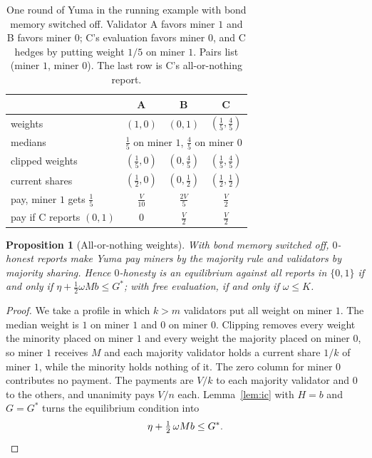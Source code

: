 \documentclass[sigconf,anonymous,review]{acmart}
\numberwithin{equation}{section}
\newtheorem{proposition}[theorem]{Proposition}
\newcommand{\Gs}{G^{*}}
\begin{document}
\begin{table}[t]
\caption{One round of Yuma in the running example with bond memory switched
off. Validator A favors miner $1$ and B favors miner $0$; C's evaluation favors
miner $0$, and C hedges by putting weight $1/5$ on miner $1$. Pairs list
(miner $1$, miner $0$). The last row is C's all-or-nothing report.}
\label{tab:round}
\small
\begin{tabular}{@{}lccc@{}}
\toprule
& A & B & C \\
\midrule
weights & $(1,0)$ & $(0,1)$ & $(\frac15,\frac45)$ \\
medians & \multicolumn{3}{c}{$\frac15$ on miner $1$, $\frac45$ on miner $0$} \\
clipped weights & $(\frac15,0)$ & $(0,\frac45)$ & $(\frac15,\frac45)$ \\
current shares & $(\frac12,0)$ & $(0,\frac12)$ & $(\frac12,\frac12)$ \\
pay, miner $1$ gets $\frac15$ & $\frac{V}{10}$ & $\frac{2V}{5}$ & $\frac V2$ \\
\addlinespace
pay if C reports $(0,1)$ & $0$ & $\frac V2$ & $\frac V2$ \\
\bottomrule
\end{tabular}
\end{table}

\begin{proposition}[All-or-nothing weights]\label{prop:binary}
With bond memory switched off, $0$-honest reports make Yuma pay miners by the
majority rule and validators by majority sharing. Hence $0$-honesty is an
equilibrium against all reports in $\{0,1\}$ if and only if
$\eta+\frac12\omega Mb\le\Gs$; with free evaluation, if and only if
$\omega\le K$.
\end{proposition}

\begin{proof}
We take a profile in which $k>m$ validators put all weight on miner $1$. The
median weight is $1$ on miner $1$ and $0$ on miner $0$. Clipping removes every
weight the minority placed on miner $1$ and every weight the majority placed on
miner $0$, so miner $1$ receives $M$ and each majority validator holds a
current share $1/k$ of miner $1$, while the minority holds nothing of it.
The zero column for miner $0$ contributes no payment. The payments are $V/k$ to each majority validator and $0$ to the others, and
unanimity pays $V/n$ each. Lemma~\ref{lem:ic} with $H=b$ and $G=\Gs$ turns the
equilibrium condition into
\[
\eta+\tfrac12\,\omega Mb\le\Gs .\qedhere
\]
\end{proof}
\end{document}
